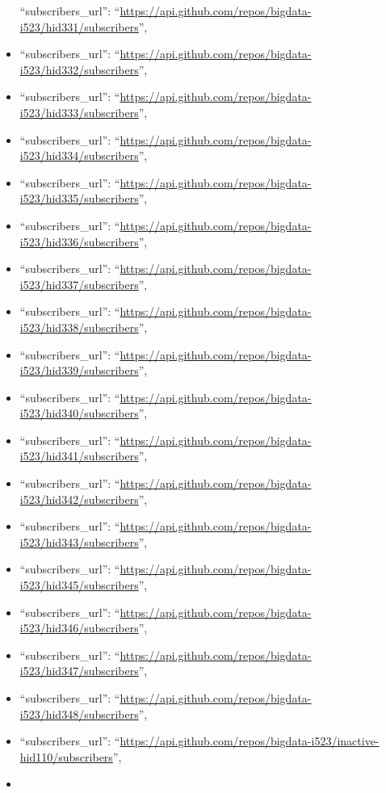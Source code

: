 \begin{itemize}
  ``subscribers\_url'':
  ``\url{https://api.github.com/repos/bigdata-i523/hid331/subscribers}'',
\item
  ``subscribers\_url'':
  ``\url{https://api.github.com/repos/bigdata-i523/hid332/subscribers}'',
\item
  ``subscribers\_url'':
  ``\url{https://api.github.com/repos/bigdata-i523/hid333/subscribers}'',
\item
  ``subscribers\_url'':
  ``\url{https://api.github.com/repos/bigdata-i523/hid334/subscribers}'',
\item
  ``subscribers\_url'':
  ``\url{https://api.github.com/repos/bigdata-i523/hid335/subscribers}'',
\item
  ``subscribers\_url'':
  ``\url{https://api.github.com/repos/bigdata-i523/hid336/subscribers}'',
\item
  ``subscribers\_url'':
  ``\url{https://api.github.com/repos/bigdata-i523/hid337/subscribers}'',
\item
  ``subscribers\_url'':
  ``\url{https://api.github.com/repos/bigdata-i523/hid338/subscribers}'',
\item
  ``subscribers\_url'':
  ``\url{https://api.github.com/repos/bigdata-i523/hid339/subscribers}'',
\item
  ``subscribers\_url'':
  ``\url{https://api.github.com/repos/bigdata-i523/hid340/subscribers}'',
\item
  ``subscribers\_url'':
  ``\url{https://api.github.com/repos/bigdata-i523/hid341/subscribers}'',
\item
  ``subscribers\_url'':
  ``\url{https://api.github.com/repos/bigdata-i523/hid342/subscribers}'',
\item
  ``subscribers\_url'':
  ``\url{https://api.github.com/repos/bigdata-i523/hid343/subscribers}'',
\item
  ``subscribers\_url'':
  ``\url{https://api.github.com/repos/bigdata-i523/hid345/subscribers}'',
\item
  ``subscribers\_url'':
  ``\url{https://api.github.com/repos/bigdata-i523/hid346/subscribers}'',
\item
  ``subscribers\_url'':
  ``\url{https://api.github.com/repos/bigdata-i523/hid347/subscribers}'',
\item
  ``subscribers\_url'':
  ``\url{https://api.github.com/repos/bigdata-i523/hid348/subscribers}'',
\item
  ``subscribers\_url'':
  ``\url{https://api.github.com/repos/bigdata-i523/inactive-hid110/subscribers}'',
\item

\end{itemize}
